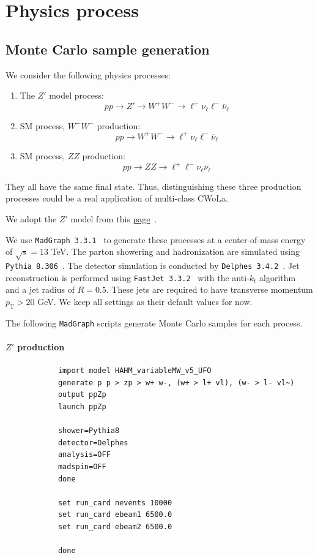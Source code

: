 \documentclass[12pt]{article}
\begin{document}
\section{Physics process}%
\label{sec:physics_process}
    \subsection{Monte Carlo sample generation}%
    \label{sub:monte_carlo_sample_generation}
        We consider the following physics processes:  
        \begin{enumerate}
            \item The $Z'$ model process:
                \[
                    p p \to Z' \to W^{+}W^{-} \to \ell^{+} \nu_{\ell} \ell^{-}\overline{\nu}_{\ell}
                \] 
            \item SM process, $W^{+}W^{-}$ production:
                \[
                    p p \to W^{+}W^{-} \to \ell^{+}\nu_{\ell} \ell^{-}\overline{\nu}_{\ell}
                \]
            \item SM process, $ZZ$ production:
                \[
                    p p \to Z Z \to \ell^{+}\ell^{-} \nu_{\ell} \overline{\nu}_{\ell}
                \] 
        \end{enumerate}
        They all have the same final state. Thus, distinguishing these three production processes could be a real application of multi-class CWoLa.

        We adopt the $Z'$ model from this \href{http://feynrules.irmp.ucl.ac.be/wiki/HAHM#no1}{page}~\cite{Curtin:2013fra, Curtin:2014cca}. 

        We use \verb|MadGraph 3.3.1|~\cite{Alwall:2014hca} to generate these processes at a center-of-mass energy of $\sqrt{s} = 13$ TeV. The parton showering and hadronization are simulated using \verb|Pythia 8.306|~\cite{Sjostrand:2014zea}. The detector simulation is conducted by \verb|Delphes 3.4.2|~\cite{deFavereau:2013fsa}. Jet reconstruction is performed using \verb|FastJet 3.3.2|~\cite{Cacciari:2011ma} with the anti-$k_t$ algorithm~\cite{Cacciari:2008gp} and a jet radius of $R = 0.5$. These jets are required to have transverse momentum $p_{\text{T}} > 20$ GeV. We keep all settings as their default values for now.

        The following \verb|MadGraph| scripts generate Monte Carlo samples for each process.

        \paragraph{$Z'$ production}
        \begin{lstlisting}
            import model HAHM_variableMW_v5_UFO
            generate p p > zp > w+ w-, (w+ > l+ vl), (w- > l- vl~)
            output ppZp
            launch ppZp

            shower=Pythia8
            detector=Delphes
            analysis=OFF
            madspin=OFF
            done

            set run_card nevents 10000
            set run_card ebeam1 6500.0
            set run_card ebeam2 6500.0

            done
        \end{lstlisting}
\end{document}
